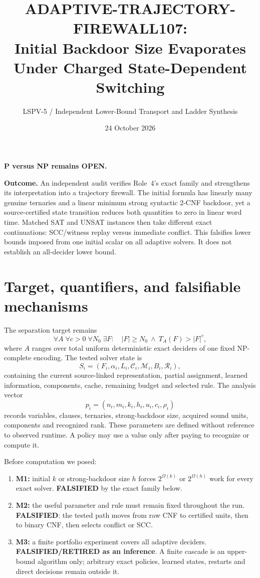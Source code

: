 \documentclass[11pt]{article}
\title{ADAPTIVE-TRAJECTORY-FIREWALL107:\\
Initial Backdoor Size Evaporates Under Charged State-Dependent Switching}
\author{LSPV-5 / Independent Lower-Bound Transport and Ladder Synthesis}
\date{24 October 2026}
\begin{document}
\maketitle

\begin{center}
\textbf{P versus NP remains OPEN.}
\end{center}

\noindent\textbf{Outcome.}
An independent audit verifies Role~4's exact family and strengthens its
interpretation into a trajectory firewall.  The initial formula has linearly
many genuine ternaries and a linear minimum strong syntactic 2-CNF backdoor,
yet a source-certified state transition reduces both quantities to zero in
linear word time.  Matched SAT and UNSAT instances then take different exact
continuations: SCC/witness replay versus immediate conflict.  This falsifies
lower bounds imposed from one initial scalar on all adaptive solvers.  It does
not establish an all-decider lower bound.

\section{Target, quantifiers, and falsifiable mechanisms}
The separation target remains
\[
\forall A\;\forall c>0\;\forall N_0\;\exists F:\quad
 |F|\ge N_0\ \land\ T_A(F)>|F|^c,
\tag{1}
\]
where $A$ ranges over total uniform deterministic exact deciders of one fixed
NP-complete encoding.  The tested solver state is
\[
S_i=(F_i,\alpha_i,L_i,\mathcal C_i,\mathcal M_i,B_i,\mathcal R_i),
\]
containing the current source-linked representation, partial assignment,
learned information, components, cache, remaining budget and selected rule.
The analysis vector
\[
p_i=(n_i,m_i,k_i,h_i,u_i,c_i,\rho_i)
\]
records variables, clauses, ternaries, strong-backdoor size, acquired sound
units, components and recognized rank.  These parameters are defined without
reference to observed runtime.  A policy may use a value only after paying to
recognize or compute it.

Before computation we posed:
\begin{enumerate}
\item \textbf{M1:} initial $k$ or strong-backdoor size $h$ forces
$2^{\Omega(k)}$ or $2^{\Omega(h)}$ work for every exact solver.
\textbf{FALSIFIED} by the exact family below.
\item \textbf{M2:} the useful parameter and rule must remain fixed throughout
the run.  \textbf{FALSIFIED}: the tested path moves from raw CNF to certified
units, then to binary CNF, then selects conflict or SCC.
\item \textbf{M3:} a finite portfolio experiment covers all adaptive
deciders.  \textbf{FALSIFIED/RETIRED as an inference}.  A finite cascade is
an upper-bound algorithm only; arbitrary exact policies, learned states,
restarts and direct decisions remain outside it.
\end{enumerate}
\end{document}

